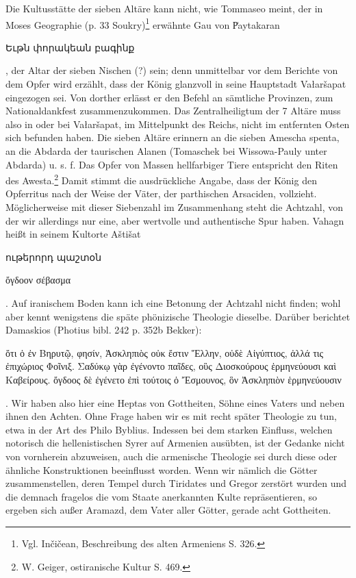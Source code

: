 \documentclass{article}
\begin{document}
Die Kultusstätte der sieben Altäre kann nicht, wie Tommaseo meint, der in Moses Geographie (p. 33 Soukry)\footnote{Vgl. Inčičean, Beschreibung des alten Armeniens S. 326.} erwähnte Gau von P͑aytakaran \begin{armenian}Եւթն փորակեան բագինք\end{armenian}, der Altar der sieben Nischen (?) sein; denn unmittelbar vor dem Berichte von dem Opfer wird erzählt, dass der König glanzvoll in seine Hauptstadt Vałaršapat eingezogen sei. Von dorther erlässt er den Befehl an sämtliche Provinzen, zum Nationaldankfest zusammenzukommen. Das Zentralheiligtum der 7 Altäre muss also in oder bei Vałaršapat, im Mittelpunkt des Reichs, nicht im entfernten Osten sich befunden haben. Die sieben Altäre erinnern an die sieben Amescha spenta, an die Abdarda der taurischen Alanen (Tomaschek bei Wissowa-Pauly unter Abdarda) u. s. f. Das Opfer von Massen hellfarbiger Tiere entspricht den Riten des Awesta.\footnote{W. Geiger, ostiranische Kultur S. 469.} Damit stimmt die ausdrückliche Angabe, dass der König den Opferritus nach der Weise der Väter, der parthischen Arsaciden, vollzieht. Möglicherweise mit dieser Siebenzahl im Zusammenhang steht die Achtzahl, von der wir allerdings nur eine, aber wertvolle und authentische Spur haben. Vahagn heißt in seinem Kultorte Aštišat \begin{armenian}ութերորդ պաշտօն\end{armenian} \begin{greek}ὄγδοον σέβασμα\end{greek}. Auf iranischem Boden kann ich eine Betonung der Achtzahl nicht finden; wohl aber kennt wenigstens die späte phönizische Theologie dieselbe. Darüber berichtet Damaskios (Photius bibl. 242 p. 352b Bekker): \begin{greek}ὅτι ὁ ἐν Βηρυτῷ, φησίν, Ἀσκληπιὸς οὐκ ἔστιν Ἕλλην, οὐδὲ Αἰγύπτιος, ἀλλά τις ἐπιχώριος Φοῖνιξ. Σαδύκῳ γὰρ ἐγένοντο παῖδες, οὓς Διοσκούρους ἑρμηνεύουσι καὶ Καβείρους. ὄγδοος δὲ ἐγένετο ἐπὶ τούτοις ὁ Ἔσμουνος, ὃν Ἀσκληπιὸν ἑρμηνεύουσιν\end{greek}. Wir haben also hier eine Heptas von Gottheiten, Söhne eines Vaters und neben ihnen den Achten. Ohne Frage haben wir es mit recht später Theologie zu tun, etwa in der Art des Philo Byblius. Indessen bei dem starken Einfluss, welchen notorisch die hellenistischen Syrer auf Armenien ausübten, ist der Gedanke nicht von vornherein abzuweisen, auch die armenische Theologie sei durch diese oder ähnliche Konstruktionen beeinflusst worden. Wenn wir nämlich die Götter zusammenstellen, deren Tempel durch Tiridates und Gregor zerstört wurden und die demnach fragelos die vom Staate anerkannten Kulte repräsentieren, so ergeben sich außer Aramazd, dem Vater aller Götter, gerade acht Gottheiten.
\end{document}
